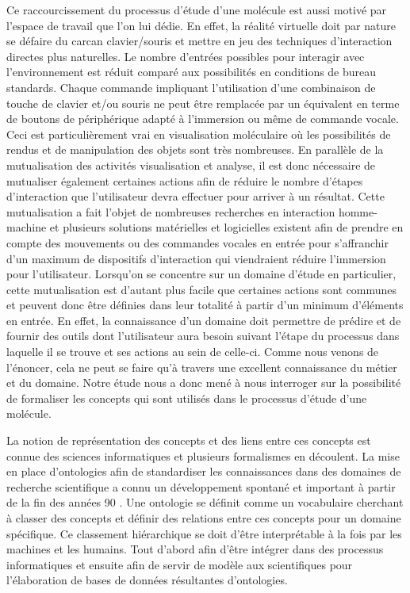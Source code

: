 Ce raccourcissement du processus d'étude d'une molécule est aussi motivé par l'espace de travail que l'on lui dédie. En effet, la réalité virtuelle doit par nature se défaire du carcan clavier/souris et mettre en jeu des techniques d'interaction directes plus naturelles. Le nombre d'entrées possibles pour interagir avec l'environnement est réduit comparé aux possibilités en conditions de bureau standards. Chaque commande impliquant l'utilisation d'une combinaison de touche de clavier et/ou souris ne peut être remplacée par un équivalent en terme de boutons de périphérique adapté à l'immersion ou même de commande vocale. Ceci est particulièrement vrai en visualisation moléculaire où les possibilités de rendus et de manipulation des objets sont très nombreuses. En parallèle de la mutualisation des activités visualisation et analyse, il est donc nécessaire de mutualiser également certaines actions afin de réduire le nombre d'étapes d'interaction que l'utilisateur devra effectuer pour arriver à un résultat. Cette mutualisation a fait l'objet de nombreuses recherches en interaction homme-machine et plusieurs solutions matérielles et logicielles existent afin de prendre en compte des mouvements ou des commandes vocales en entrée pour s'affranchir d'un maximum de dispositifs d'interaction qui viendraient réduire l'immersion pour l'utilisateur. 
Lorsqu'on se concentre sur un domaine d'étude en particulier, cette mutualisation est d'autant plus facile que certaines actions sont communes et peuvent donc être définies dans leur totalité à partir d'un minimum d'éléments en entrée. En effet, la connaissance d'un domaine doit permettre de prédire et de fournir des outils dont l'utilisateur aura besoin suivant l'étape du processus dans laquelle il se trouve et ses actions au sein de celle-ci. Comme nous venons de l'énoncer, cela ne peut se faire qu'à travers une excellent connaissance du métier et du domaine. Notre étude nous a donc mené à nous interroger sur la possibilité de formaliser les concepts qui sont utilisés dans le processus d'étude d'une molécule.

La notion de représentation des concepts et des liens entre ces concepts est connue des sciences informatiques et plusieurs formalismes en découlent. La mise en place d'ontologies afin de standardiser les connaissances dans des domaines de recherche scientifique a connu un développement spontané et important à partir de la fin des années 90 \cite{schulze-kremer_ontologies_2002, baker_ontology_1999}. Une ontologie se définit comme un vocabulaire cherchant à classer des concepts et définir des relations entre ces concepts pour un domaine spécifique. Ce classement hiérarchique se doit d'être interprétable à la fois par les machines et les humains. Tout d'abord afin d'être intégrer dans des processus informatiques et ensuite afin de servir de modèle aux scientifiques pour l'élaboration de bases de données résultantes d'ontologies.

